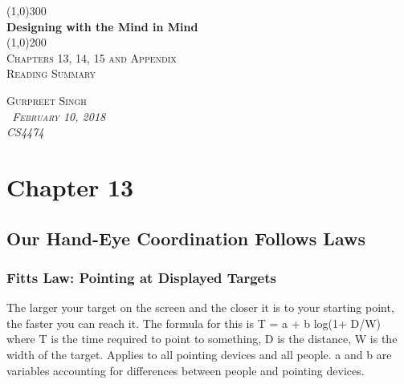 \documentclass[11pt,]{article}
\begin{document}
\begin{titlepage}
    \begin{center}
    \line(1,0){300} \\ 
    [0.25in]
    \huge{\bfseries Designing with the Mind in Mind} \\
    [2mm]
    \line(1,0){200} \\
    [1.5cm] 
    \textsc{\Large Chapters 13, 14, 15 and Appendix} \\
    [0.75cm]
    \textsc{\Large Reading Summary} \\
    [12cm]
    \end{center}
    
    \begin{flushright}
    \textsc{\Large{Gurpreet Singh \\}\normalsize\emph{\ February 10, 2018 \\}\normalsize\emph{CS4474 \\} }
    
    \end{flushright}

\end{titlepage}

\newpage
\shipout\null

\hypertarget{chapter-13}{%
\section{Chapter 13}\label{chapter-13}}

\hypertarget{our-hand-eye-coordination-follows-laws}{%
\subsection{Our Hand-Eye Coordination Follows
Laws}\label{our-hand-eye-coordination-follows-laws}}

\hypertarget{fitts-law-pointing-at-displayed-targets}{%
\subsubsection{Fitts Law: Pointing at Displayed
Targets}\label{fitts-law-pointing-at-displayed-targets}}

The larger your target on the screen and the closer it is to your
starting point, the faster you can reach it. The formula for this is T =
a + b log(1+ D/W) where T is the time required to point to something, D
is the distance, W is the width of the target. Applies to all pointing
devices and all people. a and b are variables accounting for differences
between people and pointing devices.
\end{document}
